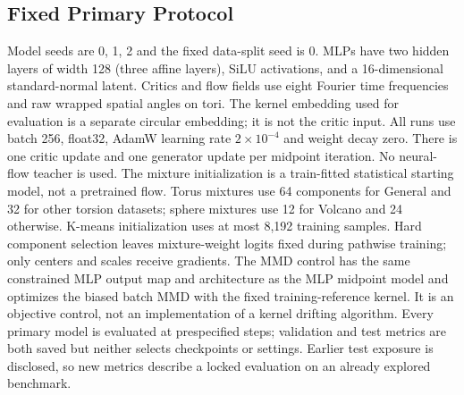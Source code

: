 \subsection{Fixed Primary Protocol}
Model seeds are 0, 1, 2 and the fixed data-split seed is 0. MLPs have two hidden layers of width 128 (three affine layers), SiLU activations, and a 16-dimensional standard-normal latent. Critics and flow fields use eight Fourier time frequencies and raw wrapped spatial angles on tori. The kernel embedding used for evaluation is a separate circular embedding; it is not the critic input.
All runs use batch 256, float32, AdamW learning rate $2\times10^{-4}$ and weight decay zero. There is one critic update and one generator update per midpoint iteration. No neural-flow teacher is used. The mixture initialization is a train-fitted statistical starting model, not a pretrained flow. Torus mixtures use 64 components for General and 32 for other torsion datasets; sphere mixtures use 12 for Volcano and 24 otherwise. K-means initialization uses at most 8,192 training samples. Hard component selection leaves mixture-weight logits fixed during pathwise training; only centers and scales receive gradients.
The MMD control has the same constrained MLP output map and architecture as the MLP midpoint model and optimizes the biased batch MMD with the fixed training-reference kernel. It is an objective control, not an implementation of a kernel drifting algorithm. Every primary model is evaluated at prespecified steps; validation and test metrics are both saved but neither selects checkpoints or settings. Earlier test exposure is disclosed, so new metrics describe a locked evaluation on an already explored benchmark.
